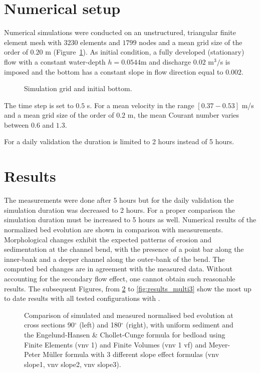 \section{Numerical setup}
%
Numerical simulations were conducted on an unstructured, triangular finite element mesh with
$3230$ elements and $1799$ nodes and a mean grid size of the order of $0.20$ m (Figure~\ref{fig:mesh}).
As initial condition, a fully developed (stationary) flow with a constant water-depth $h = 0.0544$m and discharge $0.02$ m$^3/$s is imposed and the bottom has a constant slope in flow direction equal to $0.002$.

\begin{figure} [!h]
\centering
 \caption{Simulation grid and initial bottom.}\label{fig:mesh}
\end{figure}

The time step is set to $0.5$ s. For a mean velocity in the range $[0.37-0.53]$ m/s and
a mean grid size of the order of $0.2$ m, the mean Courant number varies between $0.6$ and $1.3$.

For a daily validation the duration is limited to 2 hours instead of 5 hours.

\section{Results}
%
The measurements were done after 5 hours but for the daily validation the simulation duration was decreased to 2 hours. For a proper comparison the simulation duration must be increased to 5 hours as well.
Numerical results of the normalized bed evolution are shown in
comparison with measurements.
Morphological changes exhibit the expected
patterns of erosion and sedimentation at the channel bend, with the presence of a point bar along the inner-bank and a deeper channel along the outer-bank of the bend.
The computed bed changes are in agreement with the measured data. Without accounting for the secondary flow effect, one cannot obtain such reasonable results.
The subsequent Figures, from \ref{fig:results} to \ref{fig:results_multi3} show the most up to date results with all tested configurations with \gaia.

\begin{figure} [!h]
\centering
{}
\caption{Comparison of simulated and measured normalised bed evolution at cross sections 90$^{\circ}$ (left) and 180$^{\circ}$ (right), with uniform sediment and the Engelund-Hansen \& Chollet-Cunge formula for bedload using Finite Elements (vnv 1) and Finite Volumes (vnv 1 vf) and Meyer-Peter Müller formula with 3 different slope effect formulas (vnv slope1, vnv slope2, vnv slope3).}\label{fig:results}
\end{figure}

